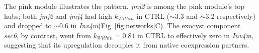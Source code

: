 \documentclass[9pt,twocolumn,twoside]{rilabRxiv}
\newcommand{\invfour}{\textit{Inv4m}\xspace}
\newcommand{\jmjii}{\textit{jmj2}\xspace}
\newcommand{\jmjiv}{\textit{jmj4}\xspace}
\begin{document}
The pink module illustrates the pattern. 
\jmjii is among the pink module's top hubs; both \jmjii and \jmjiv had high $k_{Within}$ in CTRL ($\sim$3.3 and $\sim$3.2 respectively) and dropped to $\sim$0.6 in \invfour (Fig~\ref{fig:networks}C). 
The exocyst component \textit{sec6}, by contrast, went from $k_{Within} = 0.81$ in CTRL to effectively zero in \invfour, suggesting that its upregulation decouples it from native coexpression partners.

\end{document}
